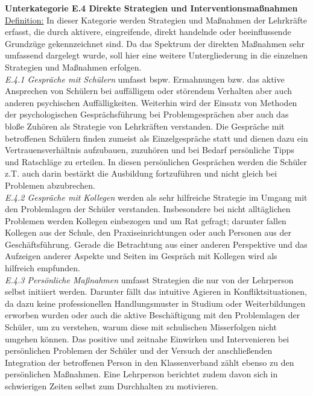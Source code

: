 \noindent
\textbf{Unterkategorie E.4 Direkte Strategien und Interventionsmaßnahmen}\\
\underline{Definition:} In dieser Kategorie werden Strategien und Maßnahmen der Lehrkräfte erfasst, die durch aktivere, eingreifende, direkt handelnde oder beeinflussende Grundzüge gekennzeichnet sind. Da das Spektrum der direkten Maßnahmen sehr umfassend dargelegt wurde, soll hier eine weitere Untergliederung in die einzelnen Strategien und Maßnahmen erfolgen.\\
\textit{E.4.1 Gespräche mit Schülern} umfasst bspw. Ermahnungen bzw. das aktive Ansprechen von Schülern bei auffälligem oder störendem Verhalten aber auch anderen psychischen Auffälligkeiten. Weiterhin wird der Einsatz von Methoden der psychologischen Gesprächsführung bei Problemgesprächen aber auch das bloße Zuhören als Strategie von Lehrkräften verstanden. Die Gespräche mit betroffenen Schülern finden zumeist als Einzelgespräche statt und dienen dazu ein Vertrauensverhältnis aufzubauen, zuzuhören und bei Bedarf persönliche Tipps und Ratschläge zu erteilen. In diesen persönlichen Gesprächen werden die Schüler z.T. auch darin bestärkt die Ausbildung fortzuführen und nicht gleich bei Problemen abzubrechen.\\
\textit{E.4.2 Gespräche mit Kollegen} werden als sehr hilfreiche Strategie im Umgang mit den Problemlagen der Schüler verstanden. Insbesondere bei nicht alltäglichen Problemen werden Kollegen einbezogen und um Rat gefragt; darunter fallen Kollegen aus der Schule, den Praxiseinrichtungen oder auch Personen aus der Geschäftsführung. Gerade die Betrachtung aus einer anderen Perspektive und das Aufzeigen anderer Aspekte und Seiten im Gespräch mit Kollegen wird als hilfreich empfunden.\\
\textit{E.4.3 Persönliche Maßnahmen} umfasst Strategien die nur von der Lehrperson selbst initiiert werden. Darunter fällt das intuitive Agieren in Konfliktsituationen, da dazu keine professionellen Handlungsmuster in Studium oder Weiterbildungen erworben wurden oder auch die aktive Beschäftigung mit den Problemlagen der Schüler, um zu verstehen, warum diese mit schulischen Misserfolgen nicht umgehen können. Das positive und zeitnahe Einwirken und Intervenieren bei persönlichen Problemen der Schüler und der Versuch der anschließenden Integration der betroffenen Person in den Klassenverband zählt ebenso zu den persönlichen Maßnahmen. Eine Lehrperson berichtet zudem davon sich in schwierigen Zeiten selbst zum Durchhalten zu motivieren.\\
